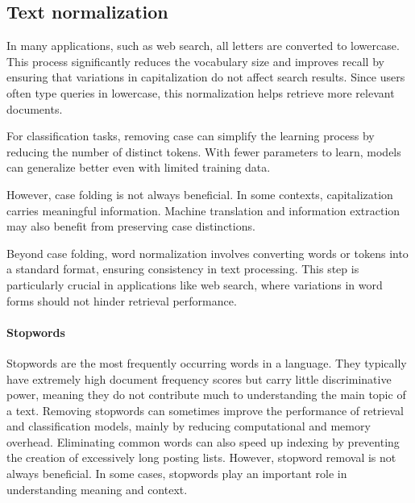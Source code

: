 \subsection{Text normalization}
In many applications, such as web search, all letters are converted to lowercase. 
This process significantly reduces the vocabulary size and improves recall by ensuring that variations in capitalization do not affect search results. 
Since users often type queries in lowercase, this normalization helps retrieve more relevant documents.

For classification tasks, removing case can simplify the learning process by reducing the number of distinct tokens. 
With fewer parameters to learn, models can generalize better even with limited training data.

However, case folding is not always beneficial. 
In some contexts, capitalization carries meaningful information.
Machine translation and information extraction may also benefit from preserving case distinctions.

Beyond case folding, word normalization involves converting words or tokens into a standard format, ensuring consistency in text processing. 
This step is particularly crucial in applications like web search, where variations in word forms should not hinder retrieval performance. 

\paragraph*{Stopwords}
Stopwords are the most frequently occurring words in a language. 
They typically have extremely high document frequency scores but carry little discriminative power, meaning they do not contribute much to understanding the main topic of a text.
Removing stopwords can sometimes improve the performance of retrieval and classification models, mainly by reducing computational and memory overhead. 
Eliminating common words can also speed up indexing by preventing the creation of excessively long posting lists.
However, stopword removal is not always beneficial. 
In some cases, stopwords play an important role in understanding meaning and context.

